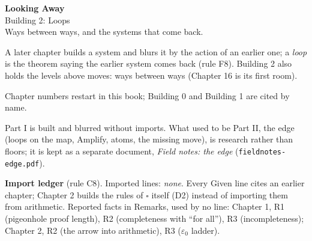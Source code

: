 

\begin{center}
{\Large\bfseries Looking Away}\\[4pt]
{\large Building 2: Loops}\\[4pt]
{\small Ways between ways, and the systems that come back.}
\end{center}
\renewcommand{\contentsname}{Contents}
\tableofcontents
\bigskip

A later chapter builds a system and blurs it by the action of an earlier one; a \emph{loop} is the theorem saying the earlier system comes back (rule F8). Building 2 also holds the levels above moves: ways between ways (Chapter 16 is its first room).

Chapter numbers restart in this book; Building 0 and Building 1 are cited by name.

Part I is built and blurred without imports. What used to be Part II, the edge (loops on the map, Amplify, atoms, the missing move), is research rather than floors; it is kept as a separate document, \emph{Field notes: the edge} (\texttt{fieldnotes-edge.pdf}).

\medskip
\noindent\textbf{Import ledger} (rule C8). Imported lines: \emph{none}. Every Given line cites an earlier chapter; Chapter 2 builds the rules of $\square$ itself (D2) instead of importing them from arithmetic. Reported facts in Remarks, used by no line: Chapter 1, R1 (pigeonhole proof length), R2 (completeness with ``for all''), R3 (incompleteness); Chapter 2, R2 (the arrow into arithmetic), R3 ($\varepsilon_0$ ladder).
\newpage


